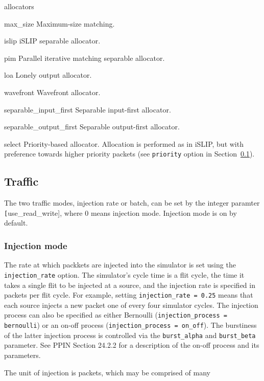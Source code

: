 \documentclass[11pt]{article}
\begin{document}
\begin{opt_list}{allocators}

\item[max\_size] Maximum-size matching. 
\item[islip] iSLIP separable allocator.
\item[pim] Parallel iterative matching separable allocator.
\item[loa] Lonely output allocator.
\item[wavefront] Wavefront allocator.
\item[separable\_input\_first] Separable input-first allocator.
\item[separable\_output\_first] Separable output-first allocator.
\item[select] Priority-based allocator.  Allocation is performed as in
iSLIP, but with preference towards higher priority packets (see
\texttt{priority} option in Section~\ref{sec:traffic}).

\end{opt_list}

\subsection{Traffic}
\label{sec:traffic}


The two traffic modes, injection rate or batch, can be set by the integer paramter \texttt[use\_read\_write], where 0 means injection mode. Injection mode is on by default.

\subsubsection{Injection mode}
The rate at which packkets are injected into the simulator is set using
the \texttt{injection\_rate} option.  The simulator's cycle time is a
flit cycle, the time it takes a single flit to be injected at a
source, and the injection rate is specified in packets per flit cycle.
For example, setting \texttt{injection\_rate = 0.25} means that each
source injects a new packet one of every four simulator cycles.  The
injection process can also be specified as either Bernoulli
(\texttt{injection\_process = bernoulli}) or an on-off process
(\texttt{injection\_process = on\_off}).  The burstiness of the latter
injection process is controlled via the \texttt{burst\_alpha} and
\texttt{burst\_beta} parameter.  See PPIN Section 24.2.2 for a
description of the on-off process and its parameters.

The unit of injection is packets, which may be comprised of many
\end{document}
